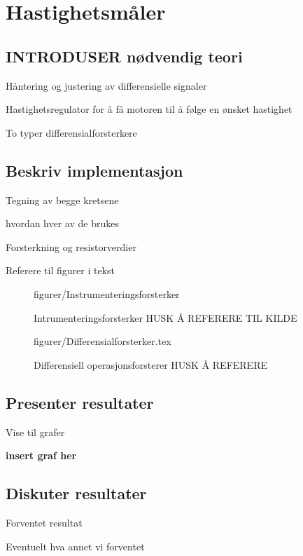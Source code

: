 \section{Hastighetsmåler}
\subsection{INTRODUSER nødvendig teori}
Håntering og justering av differensielle signaler

Hastighetsregulator for å få motoren til å følge en ønsket hastighet

To typer differensialforsterkere






\subsection{Beskriv implementasjon}
Tegning av begge kretsene

hvordan hver av de brukes

Forsterkning og resistorverdier

Referere til figurer i tekst



\begin{figure} [h]
    \centering
     {figurer/Instrumenteringsforsterker}
    \caption{Intrumenteringsforsterker HUSK Å REFERERE TIL KILDE}
    \label{fig:instrumenteringsforsterker}
\end{figure}

\begin{figure} [h]
     {figurer/Differensialforsterker.tex}
    \caption{Differensiell operasjonsforsterer HUSK Å REFERERE}
    \label{fig:differensialforsterker}
\end{figure}


\subsection{Presenter resultater}
Vise til grafer

\textbf{insert graf her}



\subsection{Diskuter resultater}

Forventet resultat

Eventuelt hva annet vi forventet

